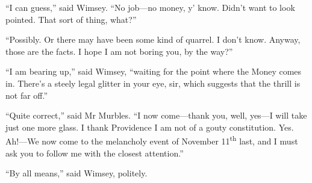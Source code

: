 \enquote{I can guess,} said Wimsey. \enquote{No job\allowbreak---\allowbreak no money, y' know. Didn't want to look pointed. That sort of thing, what?}

\enquote{Possibly. Or there may have been some kind of quarrel. I don't know. Anyway, those are the facts. I hope I am not boring you, by the way?}

\enquote{I am bearing up,} said Wimsey, \enquote{waiting for the point where the Money comes in. There's a steely legal glitter in your eye, sir, which suggests that the thrill is not far off.}

\enquote{Quite correct,} said Mr Murbles. \enquote{I now come\allowbreak---\allowbreak thank you, well, yes\allowbreak---\allowbreak I will take just one more glass. I thank Providence I am not of a gouty constitution. Yes. Ah!---We now come to the melancholy event of November  11\textsuperscript{th} last, and I must ask you to follow me with the closest attention.}

\enquote{By all means,} said Wimsey, politely.

